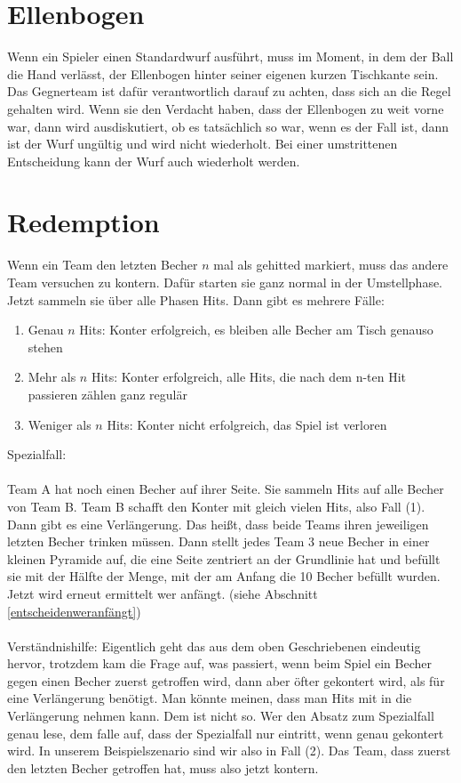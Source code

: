 \documentclass[a5paper, 12pt]{book}
\begin{document}
\section{Ellenbogen}\label{ellenbogen}
Wenn ein Spieler einen Standardwurf ausführt, muss im Moment, in dem der Ball die Hand verlässt, der Ellenbogen hinter seiner eigenen kurzen Tischkante sein.\\
Das Gegnerteam ist dafür verantwortlich darauf zu achten, dass sich an die Regel gehalten wird. Wenn sie den Verdacht haben, dass der Ellenbogen zu weit vorne war, dann wird ausdiskutiert, ob es tatsächlich so war, wenn es der Fall ist, dann ist der Wurf ungültig und wird nicht wiederholt. Bei einer umstrittenen Entscheidung kann der Wurf auch wiederholt werden.

\section{Redemption}\label{redemption}
Wenn ein Team den letzten Becher $n$ mal als gehitted markiert, muss das andere Team versuchen zu kontern. Dafür starten sie ganz normal in der Umstellphase. Jetzt sammeln sie über alle Phasen Hits. Dann gibt es mehrere Fälle:
\begin{enumerate}[(1)]
    \item Genau $n$ Hits: Konter erfolgreich, es bleiben alle Becher am Tisch genauso stehen
    \item Mehr als $n$ Hits: Konter erfolgreich, alle Hits, die nach dem n-ten Hit passieren zählen ganz regulär
    \item Weniger als $n$ Hits: Konter nicht erfolgreich, das Spiel ist verloren
\end{enumerate}
Spezialfall:\\\\
Team A hat noch einen Becher auf ihrer Seite. Sie sammeln Hits auf alle Becher von Team B. Team B schafft den Konter mit gleich vielen Hits, also Fall (1).\\
Dann gibt es eine Verlängerung. Das heißt, dass beide Teams ihren jeweiligen letzten Becher trinken müssen. Dann stellt jedes Team 3 neue Becher in einer kleinen Pyramide auf, die eine Seite zentriert an der Grundlinie hat und befüllt sie mit der Hälfte der Menge, mit der am Anfang die 10 Becher befüllt wurden. Jetzt wird erneut ermittelt wer anfängt. (siehe Abschnitt \ref{entscheidenweranfängt})\\\\
Verständnishilfe: Eigentlich geht das aus dem oben Geschriebenen eindeutig hervor, trotzdem kam die Frage auf, was passiert, wenn beim Spiel ein Becher gegen einen Becher zuerst getroffen wird, dann aber öfter gekontert wird, als für eine Verlängerung benötigt. Man könnte meinen, dass man Hits mit in die Verlängerung nehmen kann. Dem ist nicht so. Wer den Absatz zum Spezialfall genau lese, dem falle auf, dass der Spezialfall nur eintritt, wenn genau gekontert wird. In unserem Beispielszenario sind wir also in Fall (2). Das Team, dass zuerst den letzten Becher getroffen hat, muss also jetzt kontern. 
\end{document}
